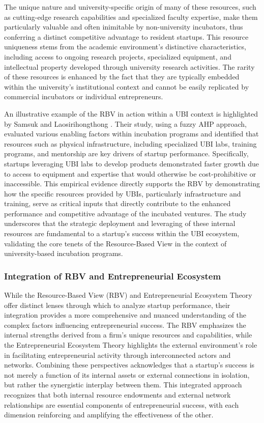 \documentclass[../Main.tex]{subfiles}
\begin{document}
The unique nature and university-specific origin of many of these resources, such as cutting-edge research capabilities and specialized faculty expertise, make them particularly valuable and often inimitable by non-university incubators, thus conferring a distinct competitive advantage to resident startups. This resource uniqueness stems from the academic environment's distinctive characteristics, including access to ongoing research projects, specialized equipment, and intellectual property developed through university research activities. The rarity of these resources is enhanced by the fact that they are typically embedded within the university's institutional context and cannot be easily replicated by commercial incubators or individual entrepreneurs.

An illustrative example of the RBV in action within a UBI context is highlighted by Samsuk and Laosirihongthong \cite{samsuk2014fuzzy}. Their study, using a fuzzy AHP approach, evaluated various enabling factors within incubation programs and identified that resources such as physical infrastructure, including specialized UBI labs, training programs, and mentorship are key drivers of startup performance. Specifically, startups leveraging UBI labs to develop products demonstrated faster growth due to access to equipment and expertise that would otherwise be cost-prohibitive or inaccessible. This empirical evidence directly supports the RBV by demonstrating how the specific resources provided by UBIs, particularly infrastructure and training, serve as critical inputs that directly contribute to the enhanced performance and competitive advantage of the incubated ventures. The study underscores that the strategic deployment and leveraging of these internal resources are fundamental to a startup's success within the UBI ecosystem, validating the core tenets of the Resource-Based View in the context of university-based incubation programs.

\subsubsection{Integration of RBV and Entrepreneurial Ecosystem}

While the Resource-Based View (RBV) and Entrepreneurial Ecosystem Theory offer distinct lenses through which to analyze startup performance, their integration provides a more comprehensive and nuanced understanding of the complex factors influencing entrepreneurial success. The RBV emphasizes the internal strengths derived from a firm's unique resources and capabilities, while the Entrepreneurial Ecosystem Theory highlights the external environment's role in facilitating entrepreneurial activity through interconnected actors and networks. Combining these perspectives acknowledges that a startup's success is not merely a function of its internal assets or external connections in isolation, but rather the synergistic interplay between them. This integrated approach recognizes that both internal resource endowments and external network relationships are essential components of entrepreneurial success, with each dimension reinforcing and amplifying the effectiveness of the other.
\end{document}
